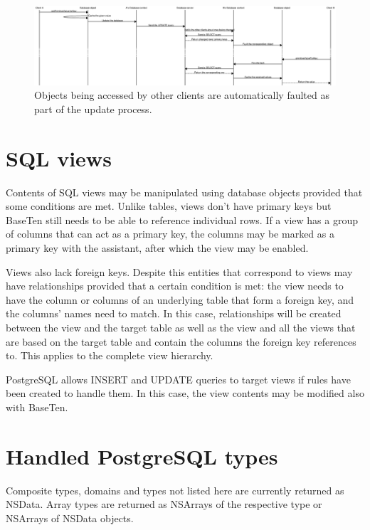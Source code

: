  
\begin{figure}
 
\begin{DoxyImage}
\includegraphics[width=\textheight]{update-change-propagation}
\caption{Objects being accessed by other clients are automatically faulted as part of the update process.}
\end{DoxyImage}
  
\end{figure}
 \hypertarget{sql_views}{}\section{S\+Q\+L views}\label{sql_views}
Contents of S\+Q\+L views may be manipulated using database objects provided that some conditions are met. Unlike tables, views don't have primary keys but Base\+Ten still needs to be able to reference individual rows. If a view has a group of columns that can act as a primary key, the columns may be marked as a primary key with the assistant, after which the view may be enabled.

Views also lack foreign keys. Despite this entities that correspond to views may have relationships provided that a certain condition is met\+: the view needs to have the column or columns of an underlying table that form a foreign key, and the columns' names need to match. In this case, relationships will be created between the view and the target table as well as the view and all the views that are based on the target table and contain the columns the foreign key references to. This applies to the complete view hierarchy.

Postgre\+S\+Q\+L allows I\+N\+S\+E\+R\+T and U\+P\+D\+A\+T\+E queries to target views if rules have been created to handle them. In this case, the view contents may be modified also with Base\+Ten. \hypertarget{database_types}{}\section{Handled Postgre\+S\+Q\+L types}\label{database_types}
Composite types, domains and types not listed here are currently returned as N\+S\+Data. Array types are returned as N\+S\+Arrays of the respective type or N\+S\+Arrays of N\+S\+Data objects.

